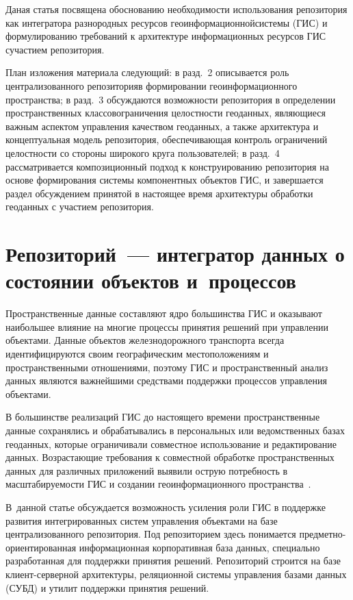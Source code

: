 \begin{multicols}{2}
      Даная статья посвящена обоснованию необходимости использования репозитория 
как интегратора разнородных ресурсов геоинформационной\linebreak системы (ГИС) и 
формулированию требований к архитектуре информационных ресурсов ГИС с\linebreak учас\-тием 
репозитория. 

План изложения материала следующий: в разд.~2 описывается роль 
централизованного репозитория\linebreak в формировании геоинформационного пространства; в 
разд.~3 обсуждаются возможности репозитория в определении пространственных 
классов\linebreak ограничения це\-лост\-ности геоданных, являющиеся важным аспектом управ\-ле\-ния 
качеством геоданных, а также архитектура и концептуальная модель репозитория, 
обеспечивающая контроль ограничений це\-лост\-ности со стороны широкого круга 
пользователей; в разд.~4 рассматривается композиционный подход к 
конструированию репозитория на основе формирования системы компонентных объектов 
ГИС, и завершается раздел обсуждением принятой в настоящее время архитектуры 
обработки геоданных с участием репозитория. 

\section{Репозиторий~--- интегратор данных о состоянии объектов 
и~процессов}
      
      Пространственные данные составляют ядро большинства ГИС и оказывают 
наибольшее влияние на многие процессы принятия решений при управлении объектами. 
Данные объектов железнодорожного транспорта всегда идентифицируются своим 
географическим местоположениям и пространственными отношениями, поэтому ГИС и 
пространственный анализ данных являются важнейшими средствами поддержки 
процессов управ\-ле\-ния объектами.
      
      В большинстве реализаций ГИС до настоящего времени пространственные данные 
сохранялись и обрабатывались в персональных или ведомственных базах геоданных, 
которые ограничивали совместное использование и редактирование данных. 
Возрастающие требования к совместной обработке пространственных данных для 
различных приложений выявили острую потребность в масштабируемости ГИС и 
создании геоинформационного пространства~\cite{1dul, 5dul}. 

В~данной статье обсуждается 
возможность усиления роли ГИС в поддержке развития интегрированных систем 
управления объектами на базе централизованного репозитория. Под репозиторием здесь 
понимается пред\-мет\-но-ориен\-ти\-ро\-ван\-ная информационная корпоративная база данных, 
специально разработанная для поддержки принятия решений. Репозиторий строится на 
базе кли\-ент-сер\-вер\-ной архитектуры, реляционной системы управления базами
данных (СУБД) и утилит поддержки принятия 
решений. 
      

\end{multicols}
